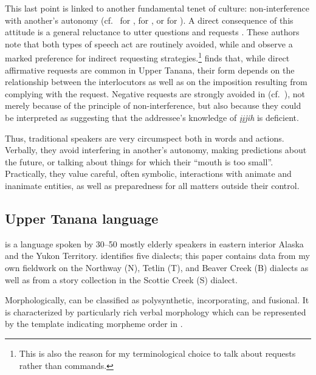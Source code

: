 \documentclass[output=paper,colorlinks,citecolor=brown]{langscibook}
\begin{document}
This last point is linked to another fundamental tenet of  culture: non-interference with another's autonomy (cf.\  \citealp{ScollonRScollonS1981} for , \citealp{RushforthSChisholmJ1991} for , or \citealp{BassoK1979, BassoK1990} for ). A direct consequence of this attitude is a general reluctance to utter questions and requests \citep{ScollonRScollonS1981}. These authors note that both types of speech act are routinely avoided, while \citet{RushforthS1985} and \citet{RushforthSChisholmJ1991} observe a marked preference for indirect requesting strategies.\footnote{This is also the reason for my terminological choice to talk about requests rather than commands.} \citet{LovickO2016} finds that, while direct affirmative requests are common in Upper Tanana, their form depends on the relationship between the interlocutors as well as on the imposition resulting from complying with the request. Negative requests are strongly avoided in  (cf.\  \citealt{LovickO2016, LovickOTuttleS2019}), not merely because of the principle of non-interference, but also because they could be interpreted as suggesting that the addressee's knowledge of \textit{įįjih} is deficient.

Thus, traditional  speakers are very circumspect both in words and actions. Verbally, they avoid interfering in another's autonomy, making predictions about the future, or talking about things for which their ``mouth is too small''. Practically, they value careful, often symbolic, interactions with animate and inanimate entities, as well as preparedness for all matters outside their control. 

\subsection{Upper Tanana language}
\label{subsection:upper-tanana}

 is a  language spoken by 30–50 mostly elderly speakers in eastern interior Alaska and the Yukon Territory. \citet{MinouraN1994} identifies five dialects; this paper contains data from my own fieldwork on the Northway (N), Tetlin (T), and Beaver Creek (B) dialects as well as from a story collection \citep{TyoneM1996} in the Scottie Creek (S) dialect.

Morphologically,  can be classified as polysynthetic, incorporating, and fusional. It is characterized by particularly rich verbal morphology which can be represented by the template indicating morpheme order in .
\end{document}
